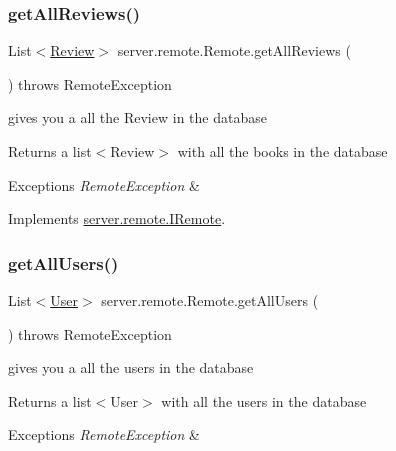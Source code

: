 \subsubsection{\texorpdfstring{get\+All\+Reviews()}{getAllReviews()}}
{\footnotesize\ttfamily List$<$\hyperlink{classserver_1_1data_1_1_review}{Review}$>$ server.\+remote.\+Remote.\+get\+All\+Reviews (\begin{DoxyParamCaption}{ }\end{DoxyParamCaption}) throws Remote\+Exception}

gives you a all the Review in the database \begin{DoxyReturn}{Returns}
a list$<$\+Review$>$ with all the books in the database 
\end{DoxyReturn}

\begin{DoxyExceptions}{Exceptions}
{\em Remote\+Exception} & \\
\hline
\end{DoxyExceptions}


Implements \hyperlink{interfaceserver_1_1remote_1_1_i_remote_a017e07cb93ae582188c20d7b1ce6b014}{server.\+remote.\+I\+Remote}.

\mbox{\label{classserver_1_1remote_1_1_remote_a3d41acc8ab7328be2082573542758f07}} 
\subsubsection{\texorpdfstring{get\+All\+Users()}{getAllUsers()}}
{\footnotesize\ttfamily List$<$\hyperlink{classserver_1_1data_1_1_user}{User}$>$ server.\+remote.\+Remote.\+get\+All\+Users (\begin{DoxyParamCaption}{ }\end{DoxyParamCaption}) throws Remote\+Exception}

gives you a all the users in the database \begin{DoxyReturn}{Returns}
a list$<$\+User$>$ with all the users in the database 
\end{DoxyReturn}

\begin{DoxyExceptions}{Exceptions}
{\em Remote\+Exception} & \\
\hline
\end{DoxyExceptions}


